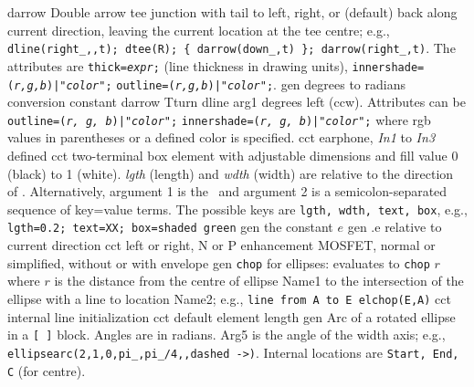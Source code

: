 %
  {darrow}%
  {Double arrow tee junction with tail to left,
   right, or (default) back along current direction, leaving the current
   location at the tee centre; e.g.,
   {\tt dline(right\_,{,}t); dtee(R);
    \{ darrow(down\_,t) \}; darrow(right\_,t)}.
   The attributes are
     {\tt thick={\sl expr};} (line thickness in drawing units),
     {\tt innershade=({\sl r,g,b})|"{\sl color}";}%
     {\tt outline=({\sl r,g,b})|"{\sl color}";}. }%
%
  {gen}%
  {degrees to radians conversion constant}%
%
  {darrow}%
  {Tturn dline arg1 degrees left (ccw).
  Attributes can be
    {\tt outline=({\sl r, g, b})|"{\sl color}";}%
    {\tt innershade=({\sl r, g, b})|"{\sl color}";}%
    where rgb values in parentheses or a defined color is specified.}%
%
%
%
  {cct}%
  {earphone, {\sl In1} to {\sl In3} defined
   }%
%
  {cct}%
  { two-terminal box element with adjustable dimensions and fill
   value 0 (black) to 1 (white). {\sl lgth} (length) and {\sl wdth} (width)
   are relative
   to the direction of \linespec. Alternatively, argument 1 is the
   \linespec\ and argument 2 is a semicolon-separated sequence of key=value
   terms.  The possible keys are {\tt lgth, wdth, text, box},
   e.g., {\tt lgth=0.2; text=XX;
     box=shaded green}}%
%
  {gen}%
  {the constant $e$}%
%
  {gen}%
  {.e relative to current direction}%
%
  {cct}%
  {left or right, N or P enhancement MOSFET, normal
   or simplified, without or with envelope
    }%
%
  {gen}%
  {{\tt chop} for ellipses: evaluates to {\tt chop} $r$ where $r$ is
    the distance from the centre of ellipse Name1 to the intersection of
    the ellipse with a line to location Name2;
    e.g., {\tt line from A to E elchop(E,A)}}%
%
  {cct}%
  {internal line initialization}%
%
  {cct}%
  {default element length}%
%
  {gen}%
  {Arc of a rotated ellipse in a {\tt [ ]} block. Angles are in radians.
   Arg5 is the angle of the width axis;
   e.g., {\tt ellipsearc(2,1,0,pi\_,pi\_/4,{},dashed ->)}.  Internal locations
   are {\tt Start, End, C} (for centre). }%
